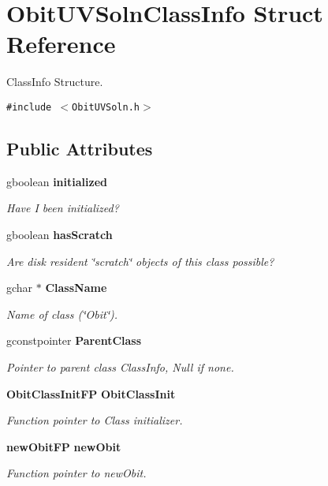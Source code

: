 \section{Obit\-UVSoln\-Class\-Info Struct Reference}
\label{structObitUVSolnClassInfo}
Class\-Info Structure.  


{\tt \#include $<$Obit\-UVSoln.h$>$}

\subsection*{Public Attributes}
\begin{CompactItemize}
\item 
gboolean {\bf initialized}
\begin{CompactList}\small\item\em Have I been initialized? \item\end{CompactList}\item 
gboolean {\bf has\-Scratch}
\begin{CompactList}\small\item\em Are disk resident \char`\"{}scratch\char`\"{} objects of this class possible? \item\end{CompactList}\item 
gchar $\ast$ {\bf Class\-Name}
\begin{CompactList}\small\item\em Name of class (\char`\"{}Obit\char`\"{}). \item\end{CompactList}\item 
gconstpointer {\bf Parent\-Class}
\begin{CompactList}\small\item\em Pointer to parent class Class\-Info, Null if none. \item\end{CompactList}\item 
{\bf Obit\-Class\-Init\-FP} {\bf Obit\-Class\-Init}
\begin{CompactList}\small\item\em Function pointer to Class initializer. \item\end{CompactList}\item 
{\bf new\-Obit\-FP} {\bf new\-Obit}
\begin{CompactList}\small\item\em Function pointer to new\-Obit. \item\end{CompactList}\item 

\end{CompactItemize}
